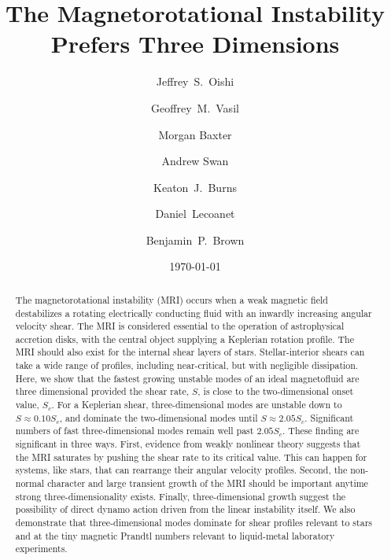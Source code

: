 \documentclass[aps,prl,reprint,superscriptaddress]{revtex4-1}
\begin{document}
\title{The Magnetorotational Instability Prefers Three Dimensions}

\author{Jeffrey~S.~Oishi}

\author{Geoffrey~M.~Vasil}
\author{Morgan Baxter}
\author{Andrew Swan}
\author{Keaton~J.~Burns}
\author{Daniel~Lecoanet}
\author{Benjamin~P.~Brown}

\date{\today}

\begin{abstract}
The magnetorotational instability (MRI) occurs when a weak magnetic field destabilizes a rotating electrically conducting fluid with an inwardly increasing angular velocity shear.
The MRI is considered essential to the operation of astrophysical accretion disks, with the central object supplying a Keplerian rotation profile.
The MRI should also exist for the internal shear layers of stars.
Stellar-interior shears can take a wide range of profiles, including near-critical, but with negligible dissipation. 
Here, we show that the fastest growing unstable modes of an ideal magnetofluid are three dimensional provided the shear rate, $S$, is close to the two-dimensional onset value, $S_c$.
For a Keplerian shear, three-dimensional modes are unstable down to $S\approx0.10S_c$, and dominate the two-dimensional modes until $S\approx2.05S_{c}$.
Significant numbers of fast three-dimensional modes remain well past $2.05S_{c}$. 
These finding are significant in three ways. 
First, evidence from weakly nonlinear theory suggests that the MRI saturates by pushing the shear rate to its critical value. 
This can happen for systems, like stars, that can rearrange their angular velocity profiles.
Second, the non-normal character and large transient growth of the MRI should be important anytime strong three-dimensionality exists.
Finally, three-dimensional growth suggest the possibility of direct dynamo action driven from the linear instability itself.
We also demonstrate that three-dimensional modes dominate for shear profiles relevant to stars and at the tiny magnetic Prandtl numbers relevant to liquid-metal laboratory experiments.
\end{abstract}
\end{document}
